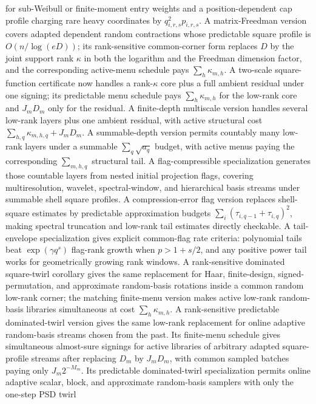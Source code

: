 \documentclass[11pt]{article}
\begin{document}
for sub-Weibull or finite-moment entry weights and a position-dependent
cap profile charging rare heavy coordinates by \(q_{i,r,s}^2p_{i,r,s}\).
A matrix-Freedman version covers adapted dependent
random contractions whose predictable square profile is \(O(n/\log(eD))\); its
rank-sensitive common-corner form replaces \(D\) by the joint support rank
\(\kappa\) in both the logarithm and the Freedman dimension factor, and the
corresponding active-menu schedule pays \(\sum_h\kappa_{m,h}\).  A
two-scale square-function certificate now handles a rank-\(\kappa\) core plus a
full ambient residual under one signing; its predictable menu schedule pays
\(\sum_h\kappa_{m,h}\) for the low-rank core and \(J_mD_m\) only for the
residual.  A finite-depth multiscale version handles several low-rank layers
plus one ambient residual, with active structural cost
\(\sum_{h,q}\kappa_{m,h,q}+J_mD_m\).  A summable-depth version permits
countably many low-rank layers under a summable \(\sum_q\sqrt{a_q}\) budget,
with active menus paying the corresponding \(\sum_{m,h,q}\) structural tail.
A flag-compressible specialization generates those countable layers from
nested initial projection flags, covering multiresolution, wavelet,
spectral-window, and hierarchical basis streams under summable shell square
profiles.  A compression-error flag version replaces shell-square estimates by
predictable approximation budgets
\(\sum_i(\tau_{i,q-1}+\tau_{i,q})^2\), making spectral truncation and low-rank
tail estimates directly checkable.  A tail-envelope specialization gives
explicit common-flag rate criteria: polynomial tails beat
\(\exp(\gamma q^s)\) flag-rank growth when \(p>1+s/2\), and any positive power
tail works for geometrically growing rank windows.
A
rank-sensitive dominated square-twirl corollary gives the same replacement for
Haar, finite-design, signed-permutation, and approximate random-basis rotations
inside a common random low-rank corner; the matching finite-menu version makes
active low-rank random-basis libraries simultaneous at cost
\(\sum_h\kappa_{m,h}\).  A rank-sensitive predictable dominated-twirl version
gives the same low-rank replacement for online adaptive random-basis streams
chosen from the past.  Its
finite-menu schedule gives simultaneous almost-sure signings for active
libraries of arbitrary adapted square-profile streams after replacing \(D_m\)
by \(J_mD_m\), with common sampled batches paying only \(J_m2^{-M_m}\).  Its
predictable dominated-twirl specialization permits online adaptive scalar,
block, and approximate random-basis samplers with only the one-step PSD twirl
\end{document}
